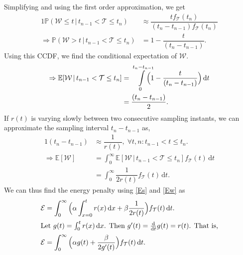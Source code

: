 Simplifying and using the first order approximation, we get
\begin{alignat*}{1}
\mathbb{P}(\mathcal{W}\leq t\,\big\vert\,t_{n-1}<\mathcal{T}\leq t_n)&\approx\dfrac{tf_\mathcal{T}(t_n)}{(t_{n}-t_{n-1})f_\mathcal{T}(t_n)}\tag{$A_2$}\label{Apx2}\\
\Rightarrow\mathbb{P}(\mathcal{W}> t\,|\,t_{n-1}<\mathcal{T}\leq t_n)&= 1-\dfrac{t}{(t_{n}-t_{n-1})}.
\end{alignat*}
Using this \ac{CCDF}, we find the conditional expectation of $\mathcal{W}$.
\begin{alignat*}{1}
\Rightarrow \mathbb{E}[\mathcal{W}\,|\,t_{n-1}<\mathcal{T}\leq t_n]&=\smashoperator[r]{\int_{0}^{t_n-t_{n-1}}}\Big(1-\dfrac{t}{(t_{n}-t_{n-1})}\Big)\,\mathrm{d}t\\
&=\dfrac{(t_n-t_{n-1})}{2}.
\end{alignat*}
If $r(t)$ is varying slowly between two consecutive sampling instants, we can approximate the sampling interval $t_n\!-\!t_{n-1}$ as,
\begin{alignat}{1}
 (t_n-t_{n-1})&\approx\dfrac{1}{r(t)},\;\forall t,n:t_{n-1}\!<\!t\!\leq\!t_n.\tag{$A_3$}\label{Apx3}\\
\Rightarrow \mathbb{E}[\mathcal{W}]&=\int_{0}^{\infty}\mathbb{E}[\mathcal{W}\,|\,t_{n-1}<\mathcal{T}\leq t_n]f_\mathcal{T}(t)\,\mathrm{d}t\nonumber\\
&=\int_{0}^{\infty}\dfrac{1}{2r(t)}f_\mathcal{T}(t)\,\mathrm{d}t.\label{Ew}
\end{alignat}
We can thus find the energy penalty using \cref{Es} and \cref{Ew} as
\begin{alignat*}{1}
\mathcal{E}&=\int_{0}^{\infty}\Big(\alpha\int_{x=0}^{t}r(x)\,\mathrm{d}x+\beta\dfrac{1}{2r(t)}\Big)f_{\mathcal{T}}(t)\,\mathrm{d}t.\label{epsilon_eulerForm}\\
\intertext{Let $g(t)=\int_{0}^{t}r(x)\dif x$. Then  $g'(t)=\tfrac{\mathrm{d}}{\mathrm{d}t}g(t)=r(t)$. That is,}
\vspace{-4cm}\mathcal{E}&=\int_{0}^{\infty}\Big(\alpha g(t)+\dfrac{\beta}{2g'(t)}\Big)f_{\mathcal{T}}(t)\,\mathrm{d}t.
\end{alignat*}
